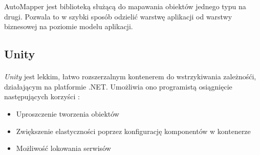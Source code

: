 AutoMapper jest biblioteką służącą do mapawania obiektów jednego typu na drugi. Pozwala to w szybki sposób odzielić warstwę aplikacji od warstwy biznesowej na poziomie modelu aplikacji.

\subsection{Unity} %
\label{sub:unity}
\paragraph{} %
\label{par:paragraph_name}
\textit{Unity} jest lekkim, łatwo rozszerzalnym kontenerem do wstrzykiwania zależnośći, działającym na platformie .NET. Umożliwia ono programistą osiągnięcie następujących korzyści :
\begin{itemize}
\item Uproszczenie tworzenia obiektów
\item Zwiększenie elastyczności poprzez konfigurację komponentów w kontenerze
\item Możliwość lokowania serwisów
\end{itemize}

